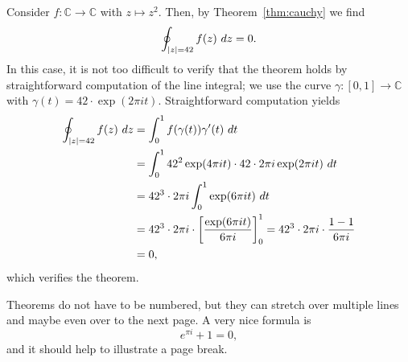 \documentclass[11pt, twoside, bachelor]{bhthesis}
\DeclarePairedDelimiter{\abs}{\lvert}{\rvert}
\begin{document}
\begin{example}
  Consider $f\colon \mathbb{C} \to \mathbb{C}$ with $z\mapsto
  z^{2}$. Then, by Theorem~\ref{thm:cauchy} we find
  \[ \oint_{\abs{z} = 42} f(z)~dz = 0.  \]
  In this case, it is not too difficult to verify that the theorem
  holds by straightforward computation of the line integral; we use
  the curve $\gamma\colon [0,1]\to \mathbb{C}$ with $\gamma(t) =
  42\cdot\exp(2\pi i t)$. Straightforward computation yields
  \begin{align*}
    \oint_{\abs{z} = 42} f(z)~dz
    &= \int_{0}^{1} f(\gamma(t)) \gamma'(t)~dt\\
    &= \int_{0}^{1} 42^{2} \exp(4\pi i t)\cdot 42\cdot 2\pi i
      \exp(2\pi i t)~dt\\
    &= 42^{3}\cdot 2\pi i \int_{0}^{1} \exp(6\pi i t)~dt\\
    &= 42^{3}\cdot 2\pi i \cdot \biggl[\frac{\exp(6 \pi i t)}{6 \pi
      i}\biggr]_{0}^{1} = 42^{3}\cdot 2\pi i\cdot \frac{1 - 1}{6\pi
      i}\\
    & = 0,
  \end{align*}
  which verifies the theorem.
\end{example}

\begin{theorem*}
  Theorems do not have to be numbered, but they can stretch over
  multiple lines and maybe even over to the next page. A very nice
  formula is
  \[ e^{\pi i} + 1 = 0, \]
  and it should help to illustrate a page break.
\end{theorem*}
\end{document}
